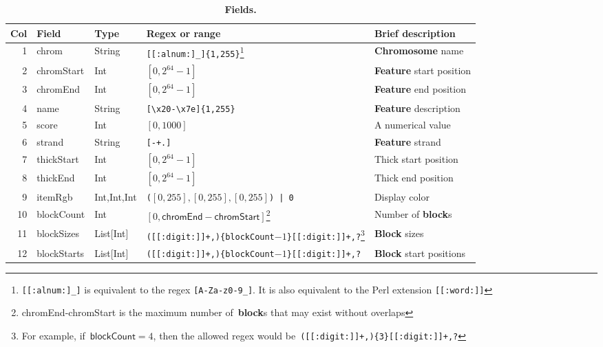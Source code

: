 \documentclass[11pt]{article}
\begin{document}
\begin{savenotes}
  \begin{table}
    \begin{adjustwidth}{-0.5in}{-0.5in}
      \begin{tabularx}{\linewidth}{r l l l L}
        \toprule
        Col & Field & Type & Regex or range & Brief description \\
        & \textsf{chrom}
        & String
        & \texttt{[[:alnum:]\_]\{1,255\}}\footnote{\texttt{[[:alnum:]\_]} is equivalent to the \ac{regex} \texttt{[A-Za-z0-9\_]}. %
        It is also equivalent to the Perl extension \texttt{[[:word:]]}}
        & \textbf{Chromosome} name \\

        2 & \textsf{chromStart} & Int & $[0, 2^{64}-1]$ & \textbf{Feature} start position \\
        3 & \textsf{chromEnd} & Int & $[0, 2^{64} -1]$ & \textbf{Feature} end position \\
        4 & \textsf{name} & String & \texttt{[{\textbackslash}x20-{\textbackslash}x7e]\{1,255\}} & \textbf{Feature} description \\
        5 & \textsf{score} & Int & $[0, 1000]$ & A numerical value \\
        6 & \textsf{strand} & String & \texttt{[-+.]} & \textbf{Feature} strand \\
        7 & \textsf{thickStart} & Int & $[0, 2^{64}-1]$ & Thick start position \\
        8 & \textsf{thickEnd} & Int & $[0, 2^{64}-1]$ & Thick end position \\
        9 & \textsf{itemRgb} & Int,Int,Int & \texttt{(}$[0, 255], [0,255], [0,255]$\texttt{) | 0} & Display color \\ %

        10
        & \textsf{blockCount}
        & Int
        & $[0, \textsf{chromEnd}-\textsf{chromStart}]$\footnote{\textsf{chromEnd}-\textsf{chromStart} is the maximum number of~\textbf{block}s that may exist without overlaps}
        & Number of \textbf{block}s \\

        11
        & \textsf{blockSizes}
        & List[Int]
        & \texttt{([[:digit:]]+,)\{\textsf{blockCount}$-1$\}[[:digit:]]+,?}\footnote{For example, if~$\textsf{blockCount} = 4$, then the allowed \ac{regex} would be~\texttt{([[:digit:]]+,)\{3\}[[:digit:]]+,?}}
        & \textbf{Block} sizes \\

        12 & \textsf{blockStarts} & List[Int] & \texttt{([[:digit:]]+,)\{\textsf{blockCount}$-1$\}[[:digit:]]+,?} & \textbf{Block} start positions \\
        \bottomrule
      \end{tabularx}
    \end{adjustwidth}
    \caption{\textbf{Fields.}}\label{tab:fields}
  \end{table}
\end{savenotes}
\end{document}

